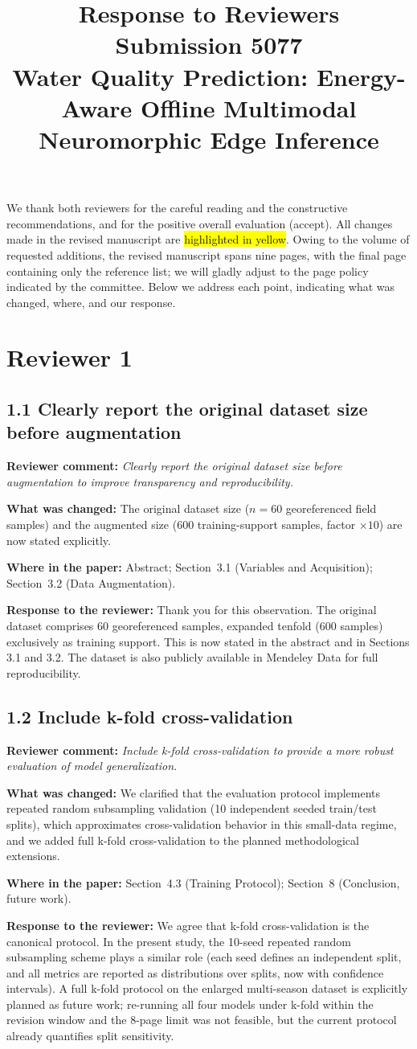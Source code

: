 \documentclass[11pt,a4paper]{article}
\title{Response to Reviewers\\[2mm]
\large Submission 5077\\[1mm]
Water Quality Prediction: Energy-Aware Offline Multimodal Neuromorphic Edge Inference}
\author{}
\date{}
\newcommand{\comment}[1]{\textbf{Reviewer comment:} \textit{#1}}
\newcommand{\change}[1]{\textbf{What was changed:} #1}
\newcommand{\where}[1]{\textbf{Where in the paper:} #1}
\newcommand{\resp}[1]{\textbf{Response to the reviewer:} \textcolor{revblue}{#1}}
\newcommand{\pt}[1]{\subsection*{#1}}
\begin{document}
\maketitle

We thank both reviewers for the careful reading and the constructive recommendations, and for the positive overall evaluation (accept). All changes made in the revised manuscript are \colorbox{yellow}{highlighted in yellow}. Owing to the volume of requested additions, the revised manuscript spans nine pages, with the final page containing only the reference list; we will gladly adjust to the page policy indicated by the committee. Below we address each point, indicating what was changed, where, and our response.

\section*{Reviewer 1}

\pt{1.1 Clearly report the original dataset size before augmentation}
\comment{Clearly report the original dataset size before augmentation to improve transparency and reproducibility.}

\change{The original dataset size ($n=60$ georeferenced field samples) and the augmented size (600 training-support samples, factor $\times 10$) are now stated explicitly.}

\where{Abstract; Section~3.1 (Variables and Acquisition); Section~3.2 (Data Augmentation).}

\resp{Thank you for this observation. The original dataset comprises 60 georeferenced samples, expanded tenfold (600 samples) exclusively as training support. This is now stated in the abstract and in Sections 3.1 and 3.2. The dataset is also publicly available in Mendeley Data for full reproducibility.}

\pt{1.2 Include k-fold cross-validation}
\comment{Include k-fold cross-validation to provide a more robust evaluation of model generalization.}

\change{We clarified that the evaluation protocol implements repeated random subsampling validation (10 independent seeded train/test splits), which approximates cross-validation behavior in this small-data regime, and we added full k-fold cross-validation to the planned methodological extensions.}

\where{Section~4.3 (Training Protocol); Section~8 (Conclusion, future work).}

\resp{We agree that k-fold cross-validation is the canonical protocol. In the present study, the 10-seed repeated random subsampling scheme plays a similar role (each seed defines an independent split, and all metrics are reported as distributions over splits, now with confidence intervals). A full k-fold protocol on the enlarged multi-season dataset is explicitly planned as future work; re-running all four models under k-fold within the revision window and the 8-page limit was not feasible, but the current protocol already quantifies split sensitivity.}
\end{document}
